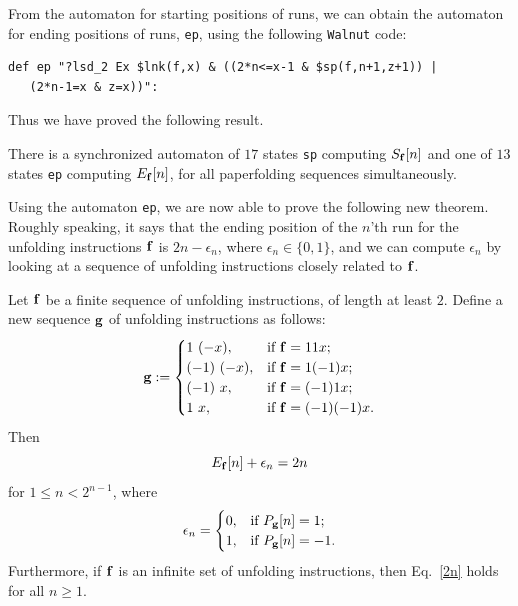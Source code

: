 \documentclass[12pt,reqno]{article}
\begin{document}
From the automaton for starting positions of runs, we can obtain the automaton
for ending positions of runs, {\tt ep}, using the following {\tt Walnut}
code:
\begin{verbatim}
def ep "?lsd_2 Ex $lnk(f,x) & ((2*n<=x-1 & $sp(f,n+1,z+1)) | 
   (2*n-1=x & z=x))":
\end{verbatim}

Thus we have proved the following result.
\begin{theorem}
There is a synchronized automaton of $17$ states {\tt sp} computing
$S_{\bf f}[n]$
and one of $13$ states {\tt ep} computing
$E_{\bf f}[n]$, for all paperfolding
sequences simultaneously.
\end{theorem}

Using the automaton {\tt ep}, we are now able to prove the following new theorem. 
Roughly speaking, it says
that the ending position of the $n$'th run for the unfolding instructions
$\bf f$ is $2n - \epsilon_n$, where
$\epsilon_n \in \{0, 1 \}$, and we can compute $\epsilon_n$ by
looking at a sequence of unfolding instructions closely related to
$\bf f$.

\begin{theorem}
Let $\bf f$ be a finite sequence of unfolding instructions, of
length at least $2$.
Define a new sequence $\bf g$ of unfolding instructions as follows:
\begin{equation}
{\bf g} := \begin{cases}
	1 \ (-x), & \text{if ${\bf f} = 11x$;} \\
	(-1) \ (-x), & \text{if ${\bf f} = 1 (-1) x$;} \\
	(-1) \ x, & \text{if ${\bf f} = (-1) 1 x $; } \\
	1 \ x, & \text{if ${\bf f} = (-1) (-1) x$}.
	\end{cases}
\label{eq1}
\end{equation}
Then 
\begin{equation}
 E_{\bf f}[n] + \epsilon_n = 2n
\label{2n}
\end{equation}
for $1 \leq n < 2^{n-1}$,
where 
$$\epsilon_n = \begin{cases}
	0, & \text{if $P_{\bf g}[n] = 1$;} \\
	1, & \text{if $P_{\bf g}[n]=-1$.}
	\end{cases}
$$
Furthermore, if $\bf f$ is an infinite set of unfolding instructions,
then Eq.~\eqref{2n} holds for all $n \geq 1$.

\end{theorem}
\end{document}
